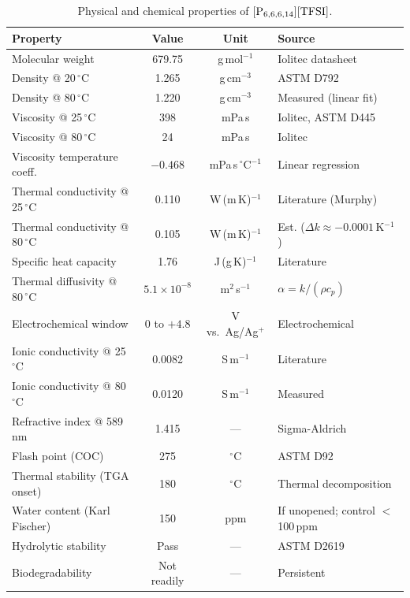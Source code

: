 \documentclass[11pt,a4paper]{article}
\begin{document}
\begin{table}[htbp]
\centering
\caption{Physical and chemical properties of $[\ce{P_{6,6,6,14}}][\ce{TFSI}]$.}
\label{tab:il_full_props}
\small
\begin{tabular}{@{}lccl@{}}
\toprule
\rowcolor{lightblue}
\textbf{Property} & \textbf{Value} & \textbf{Unit} & \textbf{Source} \\
\midrule
Molecular weight               & 679.75              & g\,mol$^{-1}$     & Iolitec datasheet \\
Density @ 20\,$^\circ$C            & 1.265               & g\,cm$^{-3}$      & ASTM D792 \\
Density @ 80\,$^\circ$C            & 1.220               & g\,cm$^{-3}$      & Measured (linear fit) \\
Viscosity @ 25\,$^\circ$C          & 398                 & mPa\,s            & Iolitec, ASTM D445 \\
Viscosity @ 80\,$^\circ$C          & 24                  & mPa\,s            & Iolitec \\
Viscosity temperature coeff.   & $-0.468$            & mPa\,s\,$^\circ$C$^{-1}$ & Linear regression \\
Thermal conductivity @ 25\,$^\circ$C & 0.110             & W\,(m\,K)$^{-1}$  & Literature (Murphy) \\
Thermal conductivity @ 80\,$^\circ$C & 0.105             & W\,(m\,K)$^{-1}$  & Est. ($\Delta k \approx -0.0001$\,K$^{-1}$) \\
Specific heat capacity         & 1.76                & J\,(g\,K)$^{-1}$  & Literature \\
Thermal diffusivity @ 80\,$^\circ$C & $5.1\times10^{-8}$ & m$^2$\,s$^{-1}$   & $\alpha=k/(\rho c_p)$ \\
Electrochemical window         & 0 to $+4.8$         & V vs.\ Ag/Ag$^+$  & Electrochemical \\
Ionic conductivity @ 25\,$^\circ$C & 0.0082             & S\,m$^{-1}$       & Literature \\
Ionic conductivity @ 80\,$^\circ$C & 0.0120             & S\,m$^{-1}$       & Measured \\
Refractive index @ 589\,nm     & 1.415               & ---               & Sigma-Aldrich \\
Flash point (COC)              & 275                 & $^\circ$C            & ASTM D92 \\
Thermal stability (TGA onset)  & 180                 & $^\circ$C            & Thermal decomposition \\
Water content (Karl Fischer)   & 150                 & ppm               & If unopened; control $<$100\,ppm \\
Hydrolytic stability           & Pass                & ---               & ASTM D2619 \\
Biodegradability               & Not readily         & ---               & Persistent \\
\bottomrule
\end{tabular}
\end{table}
\end{document}
